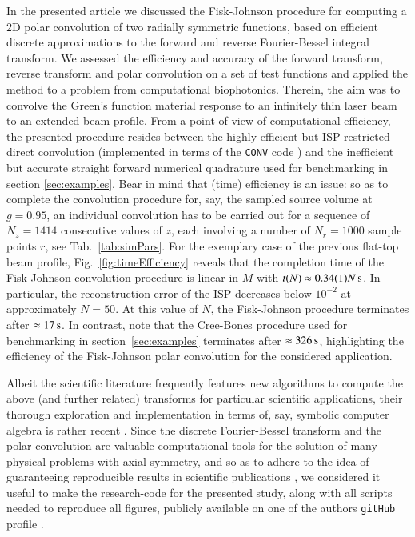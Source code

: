 \documentclass[review]{elsarticle}
\begin{document}
In the presented article we discussed the Fisk-Johnson procedure for computing
a $2$D polar convolution of two radially symmetric functions, based on
efficient discrete approximations to the forward and reverse Fourier-Bessel
integral transform. 
We assessed the efficiency and accuracy of the forward transform, reverse
transform and polar convolution on a set of test functions and applied the
method to a problem from computational biophotonics. Therein, the aim was to
convolve the Green's function material response to an infinitely thin laser
beam to an extended beam profile.
From a point of view of computational efficiency, the presented procedure 
resides between the highly efficient but ISP-restricted direct convolution
(implemented in terms of the {\tt CONV} code \cite{CONV:1997}) and the 
inefficient but accurate straight forward numerical quadrature used for 
benchmarking in section \ref{sec:examples}.
Bear in mind that (time) efficiency is an issue: so as to complete the
convolution procedure for, say, the sampled source volume at $g=0.95$, an
individual convolution has to be carried out for a sequence of $N_z=1414$
consecutive values of $z$, each involving a number of $N_r=1000$ sample points
$r$, see Tab.~\ref{tab:simPars}. For the exemplary case of the previous
flat-top beam profile, Fig.~\ref{fig:timeEfficiency} reveals that the
completion time of the Fisk-Johnson convolution procedure is linear in $M$ with
$t(N)\approx 0.34(1) N \,{\rm{s}}$. In particular, the reconstruction
error of the ISP decreases below $10^{-2}$ at approximately $N=50$. At this
value of $N$, the Fisk-Johnson procedure terminates after $\approx
17\,{\rm{s}}$.  In contrast, note that the Cree-Bones procedure used for
benchmarking in section~\ref{sec:examples} terminates after $\approx
326\,{\rm{s}}$, highlighting the efficiency of the Fisk-Johnson polar
convolution for the considered application. 

Albeit the scientific literature frequently features new algorithms to compute
the above (and further related) transforms for particular scientific
applications, their thorough exploration and implementation in terms of, say,
symbolic computer algebra is rather recent \cite{Dovlo:2015}.  Since the
discrete Fourier-Bessel transform and the polar convolution are valuable
computational tools for the solution of many physical problems with axial
symmetry, and so as to adhere to the idea of guaranteeing reproducible results
in scientific publications \cite{Sandve:2013,Barnes:2010}, we considered it
useful to make the research-code for the presented study, along with all
scripts needed to reproduce all figures, publicly available on one of the
authors {\tt gitHub} profile \cite{MelchertGitHub_dFBT:2016}.
\end{document}
